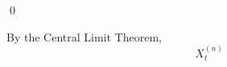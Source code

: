 \qed

\vskip 0.5cm
\begin{remark}
\mbox{}
\vskip 0.0cm
\noindent
By the Central Limit Theorem,
\begin{equation*}
X^{(n)}_{t}
\end{equation*}
\end{remark}

\renewcommand{\theenumi}{\roman{enumi}}
\renewcommand{\labelenumi}{\textnormal{(\theenumi)}$\;\;$}

